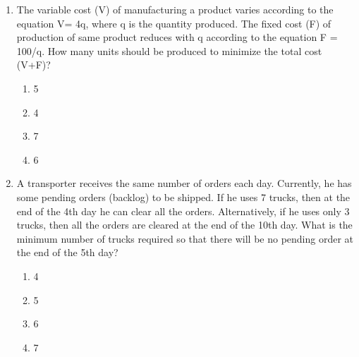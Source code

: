 \documentclass[journal,12pt,onecolumn]{IEEEtran}
\theoremstyle{remark}
\begin{document}
\begin{enumerate} [start=53]
\begin{enumerate}
    \item R
    \item S
\end{enumerate}
\item The variable cost ({V}) of manufacturing a product varies according to the equation V= 4q, where q is the quantity produced. The fixed cost (F) of production of same product reduces with q according to the equation F = 100/q. How many units should be produced to minimize the total cost (V+F)?
\begin{enumerate}
    \item 5
    \item 4
    \item 7
    \item 6
\end{enumerate}
\item  A transporter receives the same number of orders each day. Currently, he has some pending orders (backlog) to be shipped. If he uses 7 trucks, then at the end of the 4th day he can clear all the orders. Alternatively, if he uses only 3 trucks, then all the orders are cleared at the end of the 10th day. What is the minimum number of trucks required so that there will be no pending order at the end of the 5th day?
\begin{enumerate}
    \item 4
    \item 5
    \item 6
    \item 7
\end{enumerate}
\end{enumerate}
\end{document}
